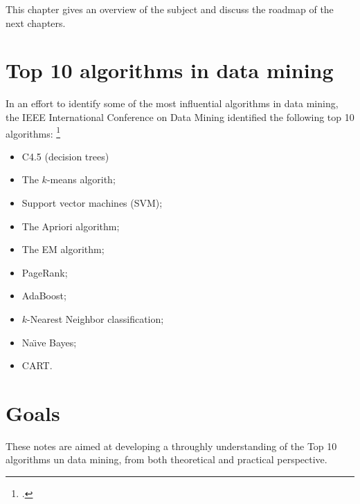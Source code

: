 


This chapter gives an overview of the subject and discuss 
the roadmap of the next chapters.

\section{Top 10 algorithms in data mining}
In an effort to identify some of the most influential algorithms in data
mining, 
the IEEE International Conference on Data Mining
identified the following top 10 algorithms:
\footcite[See][]{Wu.Kumar.ea:2007}
\begin{itemize}
   \item C4.5 (decision trees)
   \item The $k$-means algorith;
   \item Support vector machines (SVM);
   \item The Apriori algorithm;
   \item The EM algorithm;
   \item PageRank;
   \item AdaBoost;
   \item $k$-Nearest Neighbor classification;
   \item Na\"{\i}ve Bayes;
   \item CART.
\end{itemize}

\section{Goals}

These notes are aimed at developing a throughly understanding of the Top 10
algorithms un data mining, from both theoretical and practical perspective.

